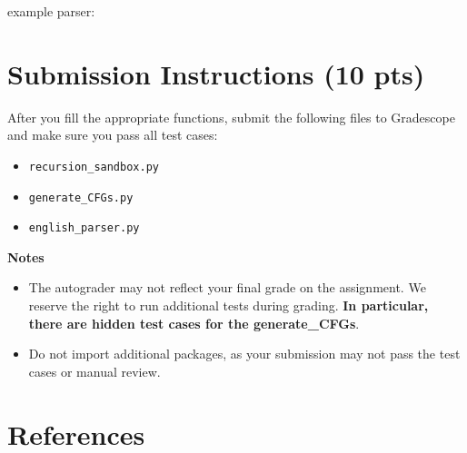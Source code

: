 \documentclass{article}
\begin{document}





example parser:




\section*{Submission Instructions (10 pts)}
    After you fill the appropriate functions, submit the following files to Gradescope and make sure you pass all test cases:
    \begin{itemize}
        \item \lstinline{recursion_sandbox.py}
        \item \lstinline{generate_CFGs.py}
        \item \lstinline{english_parser.py}
    \end{itemize}

    \vspace{3mm}
    \textbf{Notes}
    \begin{itemize}
        \item The autograder may not reflect your final grade on the assignment. We reserve the right to run additional tests during grading. \textbf{In particular, there are hidden test cases for the generate_CFGs}.
        \item Do not import additional packages, as your submission may not pass the test cases or manual review.
    \end{itemize}

    

\section*{References}
\end{document}
